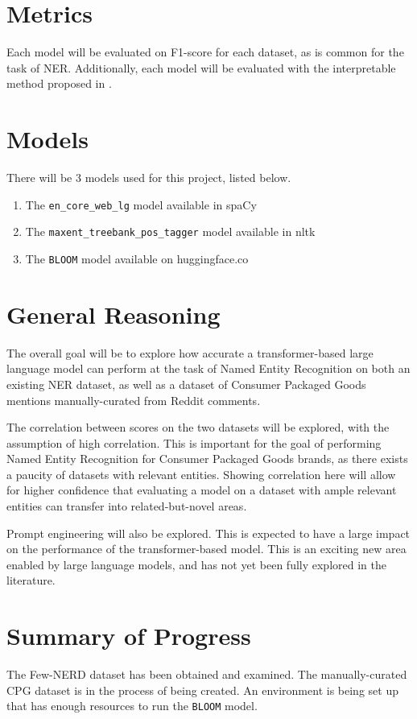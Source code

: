 \documentclass[a4paper, 11pt]{article}
\begin{document}
\section{Metrics}

Each model will be evaluated on F1-score for each dataset, as is common for the task of NER\cite{ner-eval}. Additionally, each model will be evaluated with the interpretable method proposed in \cite{ner-eval}.

\section{Models}

There will be 3 models used for this project, listed below.

\begin{enumerate}
\item The \verb|en_core_web_lg| model available in spaCy\cite{spacy}
\item The \verb|maxent_treebank_pos_tagger| model available in nltk\cite{nltk}
\item The \verb|BLOOM| model available on huggingface.co\cite{bloom}
\end{enumerate}

\section{General Reasoning}

The overall goal will be to explore how accurate a transformer-based large language model can perform at the task of Named Entity Recognition on both an existing NER dataset, as well as a dataset of Consumer Packaged Goods mentions manually-curated from Reddit comments.

The correlation between scores on the two datasets will be explored, with the assumption of high correlation. This is important for the goal of performing Named Entity Recognition for Consumer Packaged Goods brands, as there exists a paucity of datasets with relevant entities. Showing correlation here will allow for higher confidence that evaluating a model on a dataset with ample relevant entities can transfer into related-but-novel areas.

Prompt engineering will also be explored. This is expected to have a large impact on the performance of the transformer-based model. This is an exciting new area enabled by large language models, and has not yet been fully explored in the literature.

\section{Summary of Progress}

The Few-NERD dataset has been obtained and examined. The manually-curated CPG dataset is in the process of being created. An environment is being set up that has enough resources to run the \verb|BLOOM| model.



\end{document}
